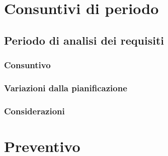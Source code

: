 \section{Consuntivi di periodo}
\subsection{Periodo di analisi dei requisiti}
\subsubsection{Consuntivo}
\subsubsection{Variazioni dalla pianificazione}
\subsubsection{Considerazioni}
\section{Preventivo}
\pagebreak